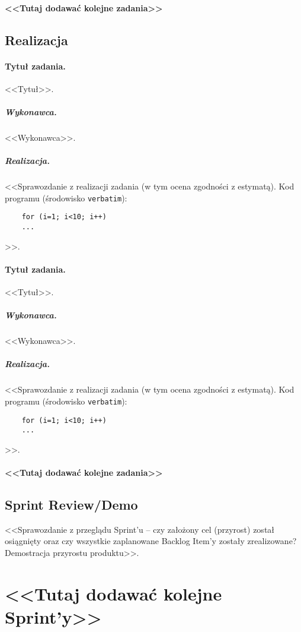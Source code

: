 \documentclass[a4paper]{article}
\begin{document}
	\paragraph{<<Tutaj dodawać kolejne zadania>>}
	
	\subsection{Realizacja}
	
	\paragraph{Tytuł zadania.} <<Tytuł>>.
	\subparagraph{Wykonawca.} <<Wykonawca>>.
	\subparagraph{Realizacja.} <<Sprawozdanie z realizacji zadania (w tym ocena zgodności z estymatą). Kod programu (środowisko \texttt{verbatim}): \begin{verbatim}
	for (i=1; i<10; i++)
	...
	\end{verbatim}>>.
	
	\paragraph{Tytuł zadania.} <<Tytuł>>.
	\subparagraph{Wykonawca.} <<Wykonawca>>.
	\subparagraph{Realizacja.} <<Sprawozdanie z realizacji zadania (w tym ocena zgodności z estymatą). Kod programu (środowisko \texttt{verbatim}): \begin{verbatim}
	for (i=1; i<10; i++)
	...
	\end{verbatim}>>.
	
	\paragraph{<<Tutaj dodawać kolejne zadania>>}
	
	
	\subsection{Sprint Review/Demo}
	<<Sprawozdanie z przeglądu Sprint'u -- czy założony cel (przyrost) został osiągnięty oraz czy wszystkie zaplanowane Backlog Item'y zostały zrealizowane? Demostracja przyrostu produktu>>.
	
	\section*{<<Tutaj dodawać kolejne Sprint'y>>}
	
\end{document}
